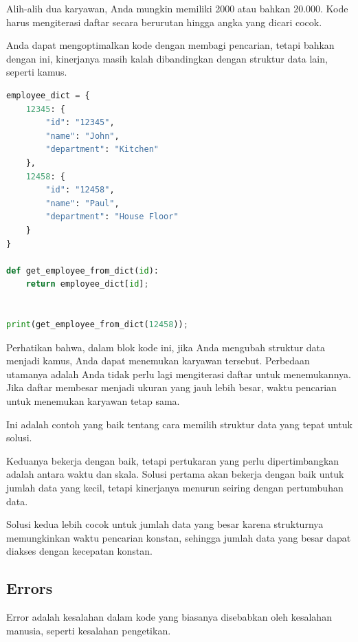 \documentclass{article}
\begin{document}
Alih-alih dua karyawan, Anda mungkin memiliki 2000 atau bahkan 20.000. Kode harus mengiterasi daftar secara berurutan hingga angka yang dicari cocok.

Anda dapat mengoptimalkan kode dengan membagi pencarian, tetapi bahkan dengan ini, kinerjanya masih kalah dibandingkan dengan struktur data lain, seperti kamus.
\begin{lstlisting}[language=Python, caption={}, captionpos=b]
employee_dict = {
    12345: {
        "id": "12345",
        "name": "John", 
        "department": "Kitchen"    
    },
    12458: {
        "id": "12458",
        "name": "Paul", 
        "department": "House Floor"    
    }
}

def get_employee_from_dict(id):
    return employee_dict[id];


print(get_employee_from_dict(12458));
\end{lstlisting}

Perhatikan bahwa, dalam blok kode ini, jika Anda mengubah struktur data menjadi kamus, Anda dapat menemukan karyawan tersebut. Perbedaan utamanya adalah Anda tidak perlu lagi mengiterasi daftar untuk menemukannya. Jika daftar membesar menjadi ukuran yang jauh lebih besar, waktu pencarian untuk menemukan karyawan tetap sama.

Ini adalah contoh yang baik tentang cara memilih struktur data yang tepat untuk solusi.

Keduanya bekerja dengan baik, tetapi pertukaran yang perlu dipertimbangkan adalah antara waktu dan skala. Solusi pertama akan bekerja dengan baik untuk jumlah data yang kecil, tetapi kinerjanya menurun seiring dengan pertumbuhan data.

Solusi kedua lebih cocok untuk jumlah data yang besar karena strukturnya memungkinkan waktu pencarian konstan, sehingga jumlah data yang besar dapat diakses dengan kecepatan konstan.

\subsection{Errors}
Error adalah kesalahan dalam kode yang biasanya disebabkan oleh kesalahan manusia, seperti kesalahan pengetikan.
\end{document}
